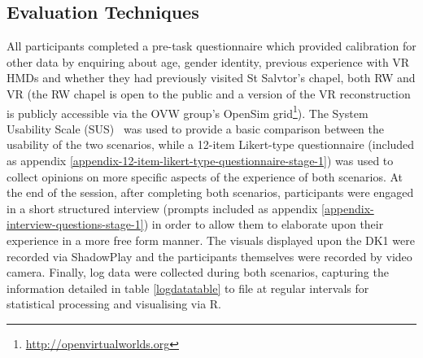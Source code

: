 
\subsection{Evaluation Techniques}
\label{stage-1-evaluation-techniques}
All participants completed a pre-task questionnaire which provided calibration for other data by enquiring about age, gender identity, previous experience with VR HMDs and whether they had previously visited St Salvtor's chapel, both RW and VR (the RW chapel is open to the public and a version of the VR reconstruction is publicly accessible via the OVW group's OpenSim grid\footnote{\url{http://openvirtualworlds.org}}). The System Usability Scale (SUS)~\cite{Brooke1996} was used to provide a basic comparison between the usability of the two scenarios, while a 12-item Likert-type questionnaire (included as appendix \ref{appendix-12-item-likert-type-questionnaire-stage-1}) was used to collect opinions on more specific aspects of the experience of both scenarios. At the end of the session, after completing both scenarios, participants were engaged in a short structured interview (prompts included as appendix \ref{appendix-interview-questions-stage-1}) in order to allow them to elaborate upon their experience in a more free form manner. The visuals displayed upon the DK1 were recorded via ShadowPlay and the participants themselves were recorded by video camera. Finally, log data were collected during both scenarios, capturing the information detailed in table \ref{logdatatable} to file at regular intervals for statistical processing and visualising via R.

\newpage

